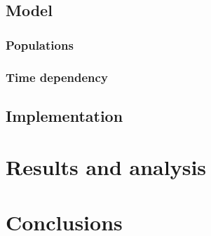 \documentclass[10pt,a4paper]{article}
\begin{document}

\subsection{Model}


\subsubsection{Populations}

\subsubsection{Time dependency}

\subsection{Implementation}

\section{Results and analysis}

\section{Conclusions}


\end{document}
